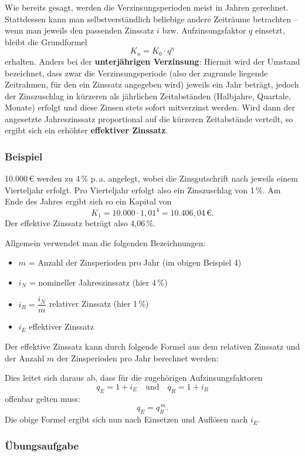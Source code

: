 Wie bereits gesagt, werden die Verzinsungsperioden meist in Jahren gerechnet. Stattdessen kann man selbstverständlich beliebige andere Zeiträume betrachten -- wenn man jeweils den passenden Zinssatz $i$ bzw. Aufzinsungsfaktor $q$ einsetzt, bleibt die Grundformel
\[ K_n = K_0 \cdot q^n \]
erhalten. Anders bei der \textbf{unterjährigen Verzinsung}: Hiermit wird der Umstand bezeichnet, dass zwar die Verzinsungsperiode (also der zugrunde liegende Zeitrahmen, für den ein Zinssatz angegeben wird) jeweils ein Jahr beträgt, jedoch der Zinszuschlag in kürzeren als jährlichen Zeitabständen (Halbjahre, Quartale, Monate) erfolgt und diese Zinsen stets sofort mitverzinst werden. Wird dann der angesetzte Jahreszinssatz proportional auf die kürzeren Zeitabstände verteilt, so ergibt sich ein erhöhter \textbf{effektiver Zinssatz}.

\subsubsection{Beispiel}

10.000\,€ werden zu 4\,\% p.\,a. angelegt, wobei die Zinsgutschrift nach jeweils einem Vierteljahr erfolgt. Pro Vierteljahr erfolgt also ein Zinszuschlag von 1\,\%. Am Ende des Jahres ergibt sich so ein Kapital von
\[ K_1 = 10.000 \cdot 1{,}01^4 = 10.406{,}04\,€ . \]
Der effektive Zinssatz beträgt also 4{,}06\,\%.\beispielende

Allgemein verwendet man die folgenden Bezeichnungen:
\begin{itemize}
  \item $m$ = Anzahl der Zinsperioden pro Jahr (im obigen Beispiel 4)
  \item $i_N$ = nomineller Jahreszinssatz (hier 4\,\%)
  \item $i_R = \dfrac{i_N}{m}$ relativer Zinssatz (hier 1\,\%)
  \item $i_E$ effektiver Zinssatz
\end{itemize}

Der effektive Zinssatz kann durch folgende Formel aus dem relativen Zinssatz und der Anzahl $m$ der Zinsperioden pro Jahr berechnet werden:
\merkbox{\[ i_E = (1 + i_R)^m - 1 \]}

Dies leitet sich daraus ab, dass für die zugehörigen Aufzinsungsfaktoren
\[ q_E = 1 + i_E \quad \text{und} \quad q_R = 1 + i_R \]
offenbar gelten muss:
\[ q_E = q_R^{\,m} . \]
Die obige Formel ergibt sich nun nach Einsetzen und Auflösen nach $i_E$.

\subsubsection{Übungsaufgabe}

